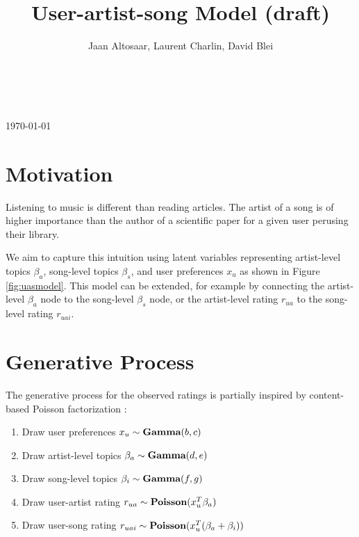 \documentclass[12pt,letterpaper]{article}
\title{User-artist-song Model (draft)}
\author{Jaan Altosaar, Laurent Charlin, David Blei}
\begin{document}
\makeatletter

\def\maketitle{%
\begin{centering}
\textbf{\large\@title}\\%
\@author\\%
{\today}\\
\end{centering}
\par}

\makeatother
\maketitle
\vspace{10mm}

\section{Motivation}

Listening to music is different than reading articles. The artist of a song is of higher importance than the author of a scientific paper for a given user perusing their library.


We aim to capture this intuition using latent variables representing artist-level topics $\beta_a$, song-level topics $\beta_s$, and user preferences $x_u$ as shown in Figure \ref{fig:uasmodel}.  This model can be extended, for example by connecting the artist-level $\beta_a$ node to the song-level $\beta_s$ node, or the artist-level rating $r_{ua}$ to the song-level rating $r_{uai}$.


\clearpage
\section{Generative Process}

The generative process for the observed ratings is partially inspired by content-based Poisson factorization \parencite{Gopalana}:

\begin{enumerate}
\item Draw user preferences $x_u \sim \textrm{\bf Gamma}(b,c)$
\item Draw artist-level topics $\beta_a \sim \textrm{\bf Gamma}(d,e)$
\item Draw song-level topics $\beta_i \sim \textrm{\bf Gamma}(f,g)$
\item Draw user-artist rating $r_{ua} \sim \textrm{\bf Poisson}(x_u^T \beta_a)$
\item Draw user-song rating $r_{uai} \sim \textrm{\bf Poisson}(x_u^T(\beta_a + \beta_i))$
\end{enumerate}
\end{document}
